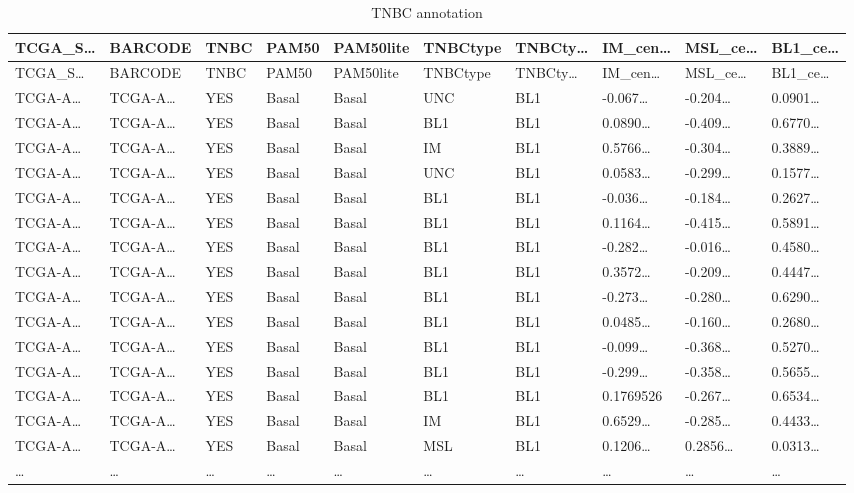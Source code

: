 \documentclass[
]{article}
\begin{document}
\begin{longtable}[]{@{}llllllllll@{}}
\caption{\label{tab:TNBC-annotation}TNBC annotation}\tabularnewline
\toprule
TCGA\_S\ldots{} & BARCODE & TNBC & PAM50 & PAM50lite & TNBCtype & TNBCty\ldots{} & IM\_cen\ldots{} & MSL\_ce\ldots{} & BL1\_ce\ldots{}\tabularnewline
\midrule
\endfirsthead
\toprule
TCGA\_S\ldots{} & BARCODE & TNBC & PAM50 & PAM50lite & TNBCtype & TNBCty\ldots{} & IM\_cen\ldots{} & MSL\_ce\ldots{} & BL1\_ce\ldots{}\tabularnewline
\midrule
\endhead
TCGA-A\ldots{} & TCGA-A\ldots{} & YES & Basal & Basal & UNC & BL1 & -0.067\ldots{} & -0.204\ldots{} & 0.0901\ldots{}\tabularnewline
TCGA-A\ldots{} & TCGA-A\ldots{} & YES & Basal & Basal & BL1 & BL1 & 0.0890\ldots{} & -0.409\ldots{} & 0.6770\ldots{}\tabularnewline
TCGA-A\ldots{} & TCGA-A\ldots{} & YES & Basal & Basal & IM & BL1 & 0.5766\ldots{} & -0.304\ldots{} & 0.3889\ldots{}\tabularnewline
TCGA-A\ldots{} & TCGA-A\ldots{} & YES & Basal & Basal & UNC & BL1 & 0.0583\ldots{} & -0.299\ldots{} & 0.1577\ldots{}\tabularnewline
TCGA-A\ldots{} & TCGA-A\ldots{} & YES & Basal & Basal & BL1 & BL1 & -0.036\ldots{} & -0.184\ldots{} & 0.2627\ldots{}\tabularnewline
TCGA-A\ldots{} & TCGA-A\ldots{} & YES & Basal & Basal & BL1 & BL1 & 0.1164\ldots{} & -0.415\ldots{} & 0.5891\ldots{}\tabularnewline
TCGA-A\ldots{} & TCGA-A\ldots{} & YES & Basal & Basal & BL1 & BL1 & -0.282\ldots{} & -0.016\ldots{} & 0.4580\ldots{}\tabularnewline
TCGA-A\ldots{} & TCGA-A\ldots{} & YES & Basal & Basal & BL1 & BL1 & 0.3572\ldots{} & -0.209\ldots{} & 0.4447\ldots{}\tabularnewline
TCGA-A\ldots{} & TCGA-A\ldots{} & YES & Basal & Basal & BL1 & BL1 & -0.273\ldots{} & -0.280\ldots{} & 0.6290\ldots{}\tabularnewline
TCGA-A\ldots{} & TCGA-A\ldots{} & YES & Basal & Basal & BL1 & BL1 & 0.0485\ldots{} & -0.160\ldots{} & 0.2680\ldots{}\tabularnewline
TCGA-A\ldots{} & TCGA-A\ldots{} & YES & Basal & Basal & BL1 & BL1 & -0.099\ldots{} & -0.368\ldots{} & 0.5270\ldots{}\tabularnewline
TCGA-A\ldots{} & TCGA-A\ldots{} & YES & Basal & Basal & BL1 & BL1 & -0.299\ldots{} & -0.358\ldots{} & 0.5655\ldots{}\tabularnewline
TCGA-A\ldots{} & TCGA-A\ldots{} & YES & Basal & Basal & BL1 & BL1 & 0.1769526 & -0.267\ldots{} & 0.6534\ldots{}\tabularnewline
TCGA-A\ldots{} & TCGA-A\ldots{} & YES & Basal & Basal & IM & BL1 & 0.6529\ldots{} & -0.285\ldots{} & 0.4433\ldots{}\tabularnewline
TCGA-A\ldots{} & TCGA-A\ldots{} & YES & Basal & Basal & MSL & BL1 & 0.1206\ldots{} & 0.2856\ldots{} & 0.0313\ldots{}\tabularnewline
\ldots{} & \ldots{} & \ldots{} & \ldots{} & \ldots{} & \ldots{} & \ldots{} & \ldots{} & \ldots{} & \ldots{}\tabularnewline
\bottomrule
\end{longtable}
\end{document}
